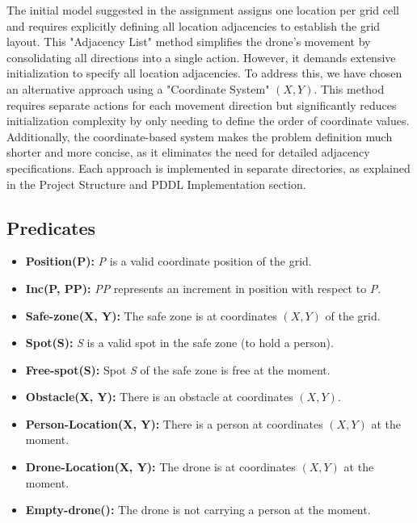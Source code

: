 \documentclass{article}
\begin{document}
\vspace{1em}

\begin{tcolorbox}[colback=gray!10, colframe=black, title=Adjacency List vs. Coordinate System Approaches]
    The initial model suggested in the assignment assigns one location per grid cell and requires explicitly defining all location adjacencies to establish the grid layout. This "Adjacency List" method simplifies the drone's movement by consolidating all directions into a single action. However, it demands extensive initialization to specify all location adjacencies. To address this, we have chosen an alternative approach using a "Coordinate System" \((X, Y)\). This method requires separate actions for each movement direction but significantly reduces initialization complexity by only needing to define the order of coordinate values. Additionally, the coordinate-based system makes the problem definition much shorter and more concise, as it eliminates the need for detailed adjacency specifications. Each approach is implemented in separate directories, as explained in the Project Structure and PDDL Implementation section.
\end{tcolorbox}
\newpage
\subsection{Predicates}\label{sec:pred}

\begin{itemize}[label=--, itemsep=0.05em]
    \item \textbf{Position(P):} \textit{P} is a valid coordinate position of the grid.
    \item \textbf{Inc(P, PP):} \textit{PP} represents an increment in position with respect to \textit{P}.
    \item \textbf{Safe-zone(X, Y):} The safe zone is at coordinates \((X, Y)\) of the grid.
    \item \textbf{Spot(S):} \textit{S} is a valid spot in the safe zone (to hold a person).
    \item \textbf{Free-spot(S):} Spot \textit{S} of the safe zone is free at the moment.
    \item \textbf{Obstacle(X, Y):} There is an obstacle at coordinates \((X, Y)\).
    \item \textbf{Person-Location(X, Y):} There is a person at coordinates \((X, Y)\) at the moment.
    \item \textbf{Drone-Location(X, Y):} The drone is at coordinates \((X, Y)\) at the moment.
    \item \textbf{Empty-drone():} The drone is not carrying a person at the moment.
\end{itemize}
\end{document}

